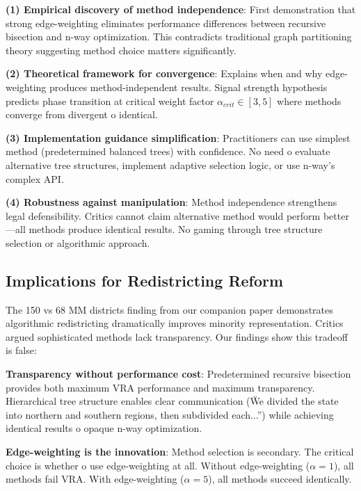 \textbf{(1) Empirical discovery of method independence}: First demonstration that strong edge-weighting eliminates performance differences between recursive bisection and n-way optimization. This contradicts traditional graph partitioning theory suggesting method choice matters significantly.

\textbf{(2) Theoretical framework for convergence}: Explains when and why edge-weighting produces method-independent results. Signal strength hypothesis predicts phase transition at critical weight factor $\alpha_{crit} \in [3,5]$ where methods converge from divergent 	o identical.

\textbf{(3) Implementation guidance simplification}: Practitioners can use simplest method (predetermined balanced trees) with confidence. No need 	o evaluate alternative tree structures, implement adaptive selection logic, or use n-way's complex API.

\textbf{(4) Robustness against manipulation}: Method independence strengthens legal defensibility. Critics cannot claim alternative method would perform better—all methods produce identical results. No gaming through tree structure selection or algorithmic approach.

\subsection{Implications for Redistricting Reform}

The 150 vs 68 MM districts finding from our companion paper \citep{dellaLibera2026nwayRecursive} demonstrates algorithmic redistricting dramatically improves minority representation. Critics argued sophisticated methods lack transparency. Our findings show this tradeoff is false:

\textbf{Transparency without performance cost}: Predetermined recursive bisection provides both maximum VRA performance and maximum transparency. Hierarchical tree structure enables clear communication (\"We divided the state into northern and southern regions, then subdivided each...'') while achieving identical results 	o opaque n-way optimization.

\textbf{Edge-weighting is the innovation}: Method selection is secondary. The critical choice is whether 	o use edge-weighting at all. Without edge-weighting ($\alpha = 1$), all methods fail VRA. With edge-weighting ($\alpha = 5$), all methods succeed identically.

